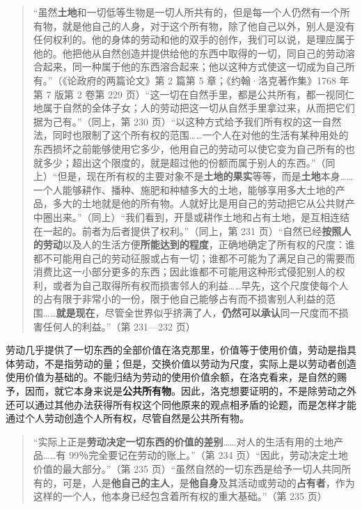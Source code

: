 \begin{quote}“虽然\textbf{土地}和一切低等生物是一切人所共有的，但是每一个人仍然有一个所有物，就是他自己的人身，对于这个所有物，除了他自己以外，别人是没有任何权利的。他的身体的劳动和他的双手的创作，我们可以说，是理应属于他的。他把他从自然创造并提供给他的东西中取得的一切，同自己的劳动溶合起来，同一种属于他的东西溶合起来；他以这种方式使这一切成为自己所有。”（《论政府的两篇论文》第 2 篇第 5 章；《约翰·洛克著作集》1768 年第 7 版第 2 卷第 229 页）“这一切在自然手里，都是公共所有，都一视同仁地属于自然的全体子女；人的劳动把这一切从自然手里拿过来，从而把它们据为己有。”（同上，第 230 页）“以这种方式给予我们所有权的这一自然法，同时也限制了这个所有权的范围……一个人在对他的生活有某种用处的东西损坏之前能够使用它多少，他用自己的劳动可以使它变为自己所有的也就多少；超出这个限度的，就是超过他的份额而属于别人的东西。”（同上）“但是，现在所有权的主要对象不是\textbf{土地的果实}等等，而是\textbf{土地}本身……一个人能够耕作、播种、施肥和种植多大的土地，能够享用多大土地的产品，多大的土地就是他的所有物。人就好比是用自己的劳动把它从公共财产中圈出来。”（同上）“我们看到，开垦或耕作土地和占有土地，是互相连结在一起的。前者为后者提供了权利。”（同上，第 231 页）“自然已经\textbf{按照人的劳动}以及人的生活方便\textbf{所能达到的程度}，正确地确定了所有权的尺度：谁都不可能用自己的劳动征服或占有一切；谁都不可能为了满足自己的需要而消费比这一小部分更多的东西；因此谁都不可能用这种形式侵犯别人的权利，或者为自己取得所有权而损害邻人的利益……早先，这个尺度使每个人的占有限于非常小的一份，限于他自己能够占有而不损害别人利益的范围……\textbf{就是现在}，尽管全世界似乎挤满了人，\textbf{仍然可以承认}同一尺度而不损害任何人的利益。”（第 231—232 页）\end{quote}

劳动几乎提供了一切东西的全部价值\fontbox{~\{}在洛克那里，价值等于使用价值，劳动是指具体劳动，不是指劳动的量；但是，交换价值以劳动为尺度，实际上是以劳动者创造使用价值为基础的\fontbox{\}~}。不能归结为劳动的使用价值余额，在洛克看来，是自然的赐予，因而，就它本身来说是\textbf{公共所有物}。因此，洛克想要证明的，不是除劳动之外还可以通过其他办法获得所有权这个同他原来的观点相矛盾的论题，而是怎样才能通过个人劳动创造个人所有权，尽管自然是公共所有物。

\begin{quote}“实际上正是\textbf{劳动决定一切东西的价值的差别}……对人的生活有用的土地产品……有 99％完全要记在劳动的账上。”（第 234 页）“因此，劳动决定土地价值的最大部分。”（第 235 页）“虽然自然的一切东西是给予一切人共同所有的，可是，人是\textbf{他自己的主人}，是\textbf{他自身}及其活动或劳动的\textbf{占有者}，作为这样的一个人，他本身已经包含着所有权的重大基础。”（第 235 页）\end{quote}

